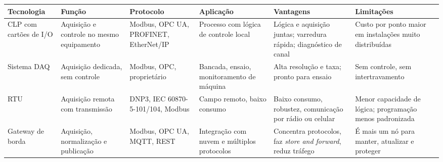 \begin{longtable}[]{@{}
  >{\raggedright\arraybackslash}p{}
  >{\raggedright\arraybackslash}p{}
  >{\raggedright\arraybackslash}p{}
  >{\raggedright\arraybackslash}p{}
  >{\raggedright\arraybackslash}p{}
  >{\raggedright\arraybackslash}p{}@{}}
\toprule\noalign{}
\begin{minipage}[b]{\linewidth}\raggedright
Tecnologia
\end{minipage} & \begin{minipage}[b]{\linewidth}\raggedright
Função
\end{minipage} & \begin{minipage}[b]{\linewidth}\raggedright
Protocolo
\end{minipage} & \begin{minipage}[b]{\linewidth}\raggedright
Aplicação
\end{minipage} & \begin{minipage}[b]{\linewidth}\raggedright
Vantagens
\end{minipage} & \begin{minipage}[b]{\linewidth}\raggedright
Limitações
\end{minipage} \\
\midrule\noalign{}
\endhead
\bottomrule\noalign{}
\endlastfoot
CLP com cartões de I/O & Aquisição e controle no mesmo equipamento & Modbus, OPC UA, PROFINET, EtherNet/IP & Processo com lógica de controle local & Lógica e aquisição juntas; varredura rápida; diagnóstico de canal & Custo por ponto maior em instalações muito distribuídas \\
Sistema DAQ & Aquisição dedicada, sem controle & Modbus, OPC, proprietário & Bancada, ensaio, monitoramento de máquina & Alta resolução e taxa; pronto para ensaio & Sem controle, sem intertravamento \\
RTU & Aquisição remota com transmissão & DNP3, IEC 60870-5-101/104, Modbus & Campo remoto, baixo consumo & Baixo consumo, robustez, comunicação por rádio ou celular & Menor capacidade de lógica; programação menos padronizada \\
Gateway de borda & Aquisição, normalização e publicação & Modbus, OPC UA, MQTT, REST & Integração com nuvem e múltiplos protocolos & Concentra protocolos, faz \emph{store and forward}, reduz tráfego & É mais um nó para manter, atualizar e proteger \\
\end{longtable}

